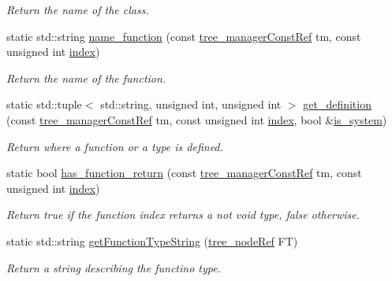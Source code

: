 \begin{DoxyCompactItemize}
\begin{DoxyCompactList}\small\item\em Return the name of the class. \end{DoxyCompactList}\item 
static std\+::string \hyperlink{classtree__helper_a06ca465189be44d278bc027b82ea8e75}{name\+\_\+function} (const \hyperlink{tree__manager_8hpp_a792e3f1f892d7d997a8d8a4a12e39346}{tree\+\_\+manager\+Const\+Ref} tm, const unsigned int \hyperlink{tutorial__pact__2019_2Introduction_2third_2include_2Keccak_8h_a028c9bdc8344cca38ab522a337074797}{index})
\begin{DoxyCompactList}\small\item\em Return the name of the function. \end{DoxyCompactList}\item 
static std\+::tuple$<$ std\+::string, unsigned int, unsigned int $>$ \hyperlink{classtree__helper_afcc09a263c77cec37dd370199cc7b81f}{get\+\_\+definition} (const \hyperlink{tree__manager_8hpp_a792e3f1f892d7d997a8d8a4a12e39346}{tree\+\_\+manager\+Const\+Ref} tm, const unsigned int \hyperlink{tutorial__pact__2019_2Introduction_2third_2include_2Keccak_8h_a028c9bdc8344cca38ab522a337074797}{index}, bool \&\hyperlink{classtree__helper_a40fcd51b5a839f80fc2120307e240d39}{is\+\_\+system})
\begin{DoxyCompactList}\small\item\em Return where a function or a type is defined. \end{DoxyCompactList}\item 
static bool \hyperlink{classtree__helper_a8de4381897b7cae4b997fad4f254bb1b}{has\+\_\+function\+\_\+return} (const \hyperlink{tree__manager_8hpp_a792e3f1f892d7d997a8d8a4a12e39346}{tree\+\_\+manager\+Const\+Ref} tm, const unsigned int \hyperlink{tutorial__pact__2019_2Introduction_2third_2include_2Keccak_8h_a028c9bdc8344cca38ab522a337074797}{index})
\begin{DoxyCompactList}\small\item\em Return true if the function index returns a not void type, false otherwise. \end{DoxyCompactList}\item 
static std\+::string \hyperlink{classtree__helper_a56789bfdeceec273e280ba343d6a3389}{get\+Function\+Type\+String} (\hyperlink{tree__node_8hpp_a6ee377554d1c4871ad66a337eaa67fd5}{tree\+\_\+node\+Ref} FT)
\begin{DoxyCompactList}\small\item\em Return a string describing the functino type. \end{DoxyCompactList}\item 

\end{DoxyCompactItemize}
